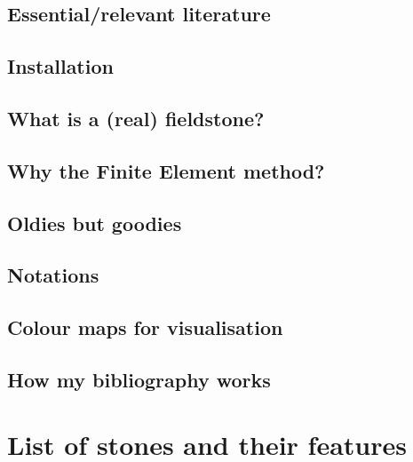\documentclass[a4paper]{article}
\numberwithin{equation}{section}
\begin{document}
\subsection{Essential/relevant literature}  %
\subsection{Installation}  %
\subsection{What is a (real) fieldstone?}  %
\subsection{Why the Finite Element method?}  %
\subsection{Oldies but goodies}  %
\subsection{Notations}  %
\subsection{Colour maps for visualisation}  %
\subsection{How my bibliography works}  %

\section{List of stones and their features} %
\end{document}
